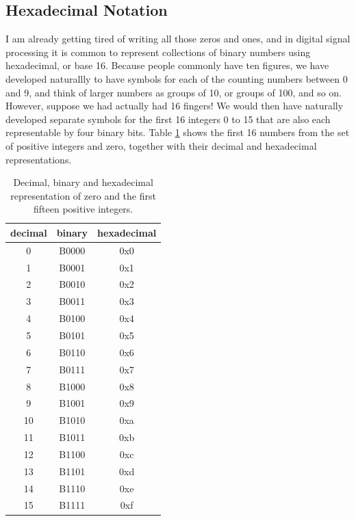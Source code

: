 \documentclass[../physical_computing.tex]{subfiles}
\begin{document}
\subsection{Hexadecimal Notation}
\label{sec:hexadecimal}

I am already getting tired of writing all those zeros and ones, and in digital signal processing it is common to represent collections of binary numbers using hexadecimal, or base 16. Because people commonly have ten figures, we have developed naturallly to have symbols for each of the counting numbers between 0 and 9, and think of larger numbers as groups of 10, or groups of 100, and so on. However, suppose we had actually had 16 fingers! We would then have naturally developed separate symbols for the first 16 integers 0 to 15 that are also each representable by four binary bits. Table \ref{tab:hexadecimal} shows the first 16 numbers from the set of positive integers and zero, together with their decimal and hexadecimal representations.

\begin{table}[hbt]
    \centering
    \begin{tabular}{|c|c|c|}
    \hline
         decimal & binary & hexadecimal \\
         \hline\hline
         0 & B0000 & 0x0 \\
         1 & B0001 & 0x1 \\
         2 & B0010 & 0x2 \\
         3 & B0011 & 0x3 \\
         4 & B0100 & 0x4 \\
         5 & B0101 & 0x5 \\
         6 & B0110 & 0x6 \\
         7 & B0111 & 0x7 \\
         8 & B1000 & 0x8 \\
         9 & B1001 & 0x9 \\
         10 & B1010 & 0xa \\
         11 & B1011 & 0xb \\
         12 & B1100 & 0xc \\
         13 & B1101 & 0xd \\
         14 & B1110 & 0xe \\
         15 & B1111 & 0xf \\
        \hline
    \end{tabular}
    \caption{Decimal, binary and hexadecimal representation of zero and the first fifteen positive integers.}
    \label{tab:hexadecimal}
\end{table}
\end{document}
